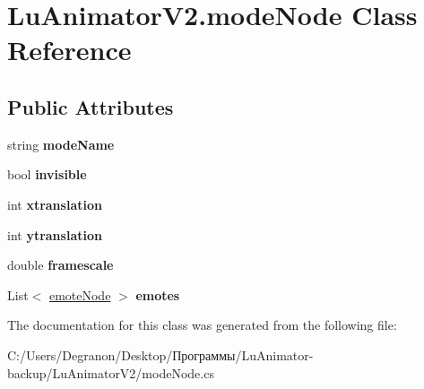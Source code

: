 \hypertarget{class_lu_animator_v2_1_1mode_node}{}\section{Lu\+Animator\+V2.\+mode\+Node Class Reference}
\label{class_lu_animator_v2_1_1mode_node}
\subsection*{Public Attributes}
\begin{DoxyCompactItemize}
\item 
string {\bfseries mode\+Name}\hypertarget{class_lu_animator_v2_1_1mode_node_ad6d9fbc8b54fe2e9adf33823af11133e}{}\label{class_lu_animator_v2_1_1mode_node_ad6d9fbc8b54fe2e9adf33823af11133e}

\item 
bool {\bfseries invisible}\hypertarget{class_lu_animator_v2_1_1mode_node_a8d1bb4d6dc5155ad46bd90f75a766f4a}{}\label{class_lu_animator_v2_1_1mode_node_a8d1bb4d6dc5155ad46bd90f75a766f4a}

\item 
int {\bfseries xtranslation}\hypertarget{class_lu_animator_v2_1_1mode_node_a480e0753baf433225980dc8b7338d7cd}{}\label{class_lu_animator_v2_1_1mode_node_a480e0753baf433225980dc8b7338d7cd}

\item 
int {\bfseries ytranslation}\hypertarget{class_lu_animator_v2_1_1mode_node_ab15a6d98a49a72484598769b8925c299}{}\label{class_lu_animator_v2_1_1mode_node_ab15a6d98a49a72484598769b8925c299}

\item 
double {\bfseries framescale}\hypertarget{class_lu_animator_v2_1_1mode_node_a3e8cb94b7f2c3d851f7d8ea1d804b6e5}{}\label{class_lu_animator_v2_1_1mode_node_a3e8cb94b7f2c3d851f7d8ea1d804b6e5}

\item 
List$<$ \hyperlink{class_lu_animator_v2_1_1emote_node}{emote\+Node} $>$ {\bfseries emotes}\hypertarget{class_lu_animator_v2_1_1mode_node_acf3d6e7f0a8ed4a09b755672cc7c2689}{}\label{class_lu_animator_v2_1_1mode_node_acf3d6e7f0a8ed4a09b755672cc7c2689}

\end{DoxyCompactItemize}


The documentation for this class was generated from the following file\+:\begin{DoxyCompactItemize}
\item 
C\+:/\+Users/\+Degranon/\+Desktop/Программы/\+Lu\+Animator-\/backup/\+Lu\+Animator\+V2/mode\+Node.\+cs\end{DoxyCompactItemize}
